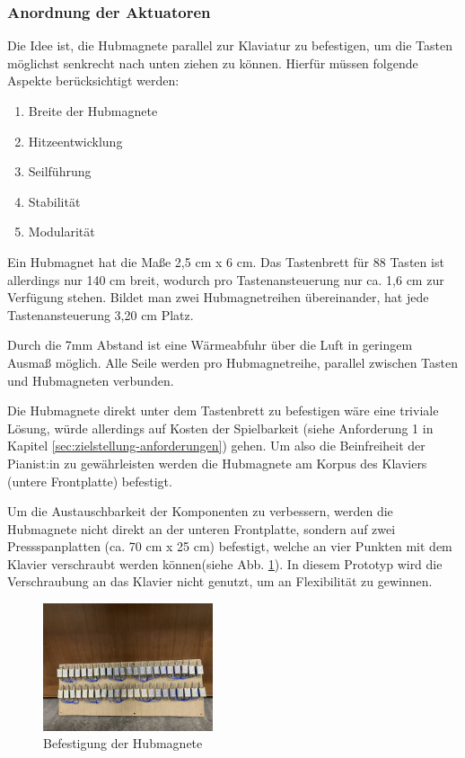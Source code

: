 \subsubsection{Anordnung der Aktuatoren}

Die Idee ist, die Hubmagnete parallel zur Klaviatur zu befestigen, um die Tasten möglichst senkrecht nach unten ziehen zu können.
Hierfür müssen folgende Aspekte berücksichtigt werden:

\begin{enumerate}
    \item Breite der Hubmagnete
    \item Hitzeentwicklung
    \item Seilführung
    \item Stabilität
    \item Modularität
\end{enumerate}

Ein Hubmagnet hat die Maße 2,5 cm x 6 cm.
Das Tastenbrett für 88 Tasten ist allerdings nur 140 cm breit, wodurch pro Tastenansteuerung nur ca. 1,6 cm zur Verfügung stehen.
Bildet man zwei Hubmagnetreihen übereinander, hat jede Tastenansteuerung 3,20 cm Platz.

Durch die 7mm Abstand ist eine Wärmeabfuhr über die Luft in geringem Ausmaß möglich.
Alle Seile werden pro Hubmagnetreihe, parallel zwischen Tasten und Hubmagneten verbunden.

Die Hubmagnete direkt unter dem Tastenbrett zu befestigen wäre eine triviale Lösung, würde allerdings auf Kosten der Spielbarkeit (siehe Anforderung 1 in Kapitel \ref{sec:zielstellung-anforderungen}) gehen.
Um also die Beinfreiheit der Pianist:in zu gewährleisten
werden die Hubmagnete am Korpus des Klaviers (untere Frontplatte) befestigt.

Um die Austauschbarkeit der Komponenten zu verbessern, werden die Hubmagnete nicht direkt an der unteren Frontplatte,
sondern auf zwei Pressspanplatten (ca. 70 cm x 25 cm) befestigt, welche an vier Punkten mit dem Klavier verschraubt werden können(siehe Abb. \ref{fig:BefestigungHubmagnete}).
In diesem Prototyp wird die Verschraubung an das Klavier nicht genutzt, um an Flexibilität zu gewinnen.

\begin{figure}[htbp]
    \centering
    \includegraphics[width=5cm]{img/Magnetbrett.jpg}
    \caption{Befestigung der Hubmagnete}
    \label{fig:BefestigungHubmagnete}
\end{figure}

